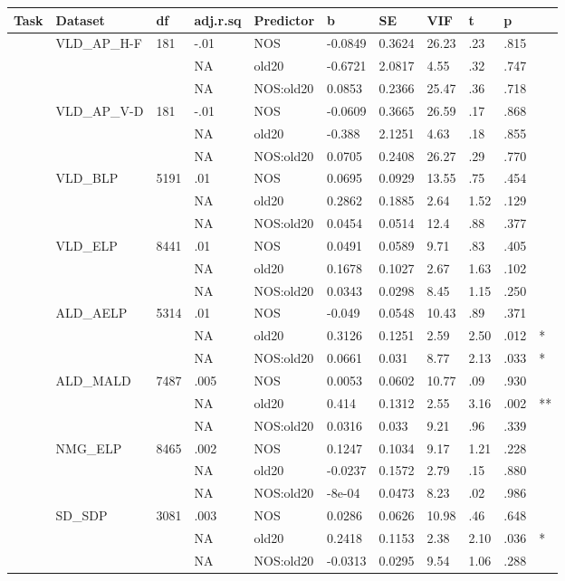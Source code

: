 \begin{table}[ht]
\centering
\begingroup\normalsize
\begin{tabular}{lllllllllll}
  \hline
Task & Dataset & df & adj.r.sq & Predictor & b & SE & VIF & t & p &  \\ 
  \hline
 & VLD\_AP\_H-F & 181 & -.01 & NOS & -0.0849 & 0.3624 & 26.23 & .23 & .815 &   \\ 
   &  &  & NA & old20 & -0.6721 & 2.0817 & 4.55 & .32 & .747 &   \\ 
   &  &  & NA & NOS:old20 & 0.0853 & 0.2366 & 25.47 & .36 & .718 &   \\ 
   & VLD\_AP\_V-D & 181 & -.01 & NOS & -0.0609 & 0.3665 & 26.59 & .17 & .868 &   \\ 
   &  &  & NA & old20 & -0.388 & 2.1251 & 4.63 & .18 & .855 &   \\ 
   &  &  & NA & NOS:old20 & 0.0705 & 0.2408 & 26.27 & .29 & .770 &   \\ 
   & VLD\_BLP & 5191 & .01 & NOS & 0.0695 & 0.0929 & 13.55 & .75 & .454 &   \\ 
   &  &  & NA & old20 & 0.2862 & 0.1885 & 2.64 & 1.52 & .129 &   \\ 
   &  &  & NA & NOS:old20 & 0.0454 & 0.0514 & 12.4 & .88 & .377 &   \\ 
   & VLD\_ELP & 8441 & .01 & NOS & 0.0491 & 0.0589 & 9.71 & .83 & .405 &   \\ 
   &  &  & NA & old20 & 0.1678 & 0.1027 & 2.67 & 1.63 & .102 &   \\ 
   &  &  & NA & NOS:old20 & 0.0343 & 0.0298 & 8.45 & 1.15 & .250 &   \\ 
   & ALD\_AELP & 5314 & .01 & NOS & -0.049 & 0.0548 & 10.43 & .89 & .371 &   \\ 
   &  &  & NA & old20 & 0.3126 & 0.1251 & 2.59 & 2.50 & .012 & * \\ 
   &  &  & NA & NOS:old20 & 0.0661 & 0.031 & 8.77 & 2.13 & .033 & * \\ 
   & ALD\_MALD & 7487 & .005 & NOS & 0.0053 & 0.0602 & 10.77 & .09 & .930 &   \\ 
   &  &  & NA & old20 & 0.414 & 0.1312 & 2.55 & 3.16 & .002 & ** \\ 
   &  &  & NA & NOS:old20 & 0.0316 & 0.033 & 9.21 & .96 & .339 &   \\ 
   & NMG\_ELP & 8465 & .002 & NOS & 0.1247 & 0.1034 & 9.17 & 1.21 & .228 &   \\ 
   &  &  & NA & old20 & -0.0237 & 0.1572 & 2.79 & .15 & .880 &   \\ 
   &  &  & NA & NOS:old20 & -8e-04 & 0.0473 & 8.23 & .02 & .986 &   \\ 
   & SD\_SDP & 3081 & .003 & NOS & 0.0286 & 0.0626 & 10.98 & .46 & .648 &   \\ 
   &  &  & NA & old20 & 0.2418 & 0.1153 & 2.38 & 2.10 & .036 & * \\ 
   &  &  & NA & NOS:old20 & -0.0313 & 0.0295 & 9.54 & 1.06 & .288 &   \\ 
   \hline
\end{tabular}
\endgroup
\end{table}
